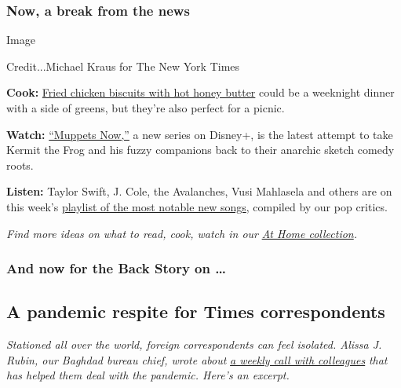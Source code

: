\hypertarget{now-a-break-from-the-news}{%
\subsubsection{Now, a break from the
news}\label{now-a-break-from-the-news}}

Image

Credit...Michael Kraus for The New York Times

\textbf{Cook:}
\href{https://cooking.nytimes.com/recipes/1018818-fried-chicken-biscuits-with-hot-honey-butter?action=click\&region=Sam\%20Sifton\%27s\%20Suggestions\&rank=1}{Fried
chicken biscuits with hot honey butter} could be a weeknight dinner with
a side of greens, but they're also perfect for a picnic.

\textbf{Watch:}
\href{https://www.nytimes.com/2020/07/23/arts/television/muppets-now-disney.html}{``Muppets
Now,''} a new series on Disney+, is the latest attempt to take Kermit
the Frog and his fuzzy companions back to their anarchic sketch comedy
roots.

\textbf{Listen:} Taylor Swift, J. Cole, the Avalanches, Vusi Mahlasela
and others are on this week's
\href{https://www.nytimes.com/2020/07/24/arts/music/playlist-taylor-swift-j-cole-drake.html}{playlist
of the most notable new songs}, compiled by our pop critics.

\emph{Find more ideas on what to read, cook, watch in our}
\href{https://www.nytimes.com/spotlight/at-home}{\emph{At Home
collection}}\emph{.}

\hypertarget{and-now-for-the-back-story-on-}{%
\subsubsection{And now for the Back Story on
\ldots{}}\label{and-now-for-the-back-story-on-}}

\hypertarget{a-pandemic-respite-for-times-correspondents}{%
\subsection{A pandemic respite for Times
correspondents}\label{a-pandemic-respite-for-times-correspondents}}

\emph{Stationed all over the world, foreign correspondents can feel
isolated. Alissa J. Rubin, our Baghdad bureau chief, wrote about}
\href{https://www.nytimes.com/2020/07/24/insider/international-journalists-meeting.html}{\emph{a
weekly call with colleagues}} \emph{that has helped them deal with the
pandemic. Here's an excerpt.}

